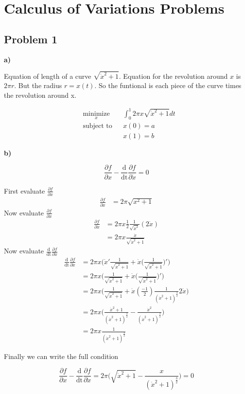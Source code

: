 \section{Calculus of Variations Problems}

\subsection{Problem 1}

\textbf{a)}

\answer

Equation of length of a curve $\sqrt{\dot{x}^2 +1}$. Equation for the revolution around $x$ is $2 \pi r$. But the radius $r = x(t)$. So the funtional is each piece of the curve times the revolution around x.

\begin{equation*}
\begin{aligned}
& \underset{x}{\text{minimize}}
& & \int_0^1 2 \pi x \sqrt{\dot{x}^2 + 1} dt \\
& \text{subject to}
& & x(0) = a \\
&&& x(1) = b
\end{aligned}
\end{equation*}

\textbf{b)}

\answer

\[
	\frac{\partial f}{\partial x} - \frac{\text{d}}{\text{dt}} \frac{\partial f}{\partial \dot{x}} = 0
\]

First evaluate $\frac{\partial f}{\partial x}$
\begin{align*}
	\frac{\partial f}{\partial x} &= 2 \pi \sqrt{x^2 + 1}
\end{align*}
Now evaluate $\frac{\partial f}{\partial \dot{x}}$
\begin{align*}
	\frac{\partial f}{\partial \dot{x}} &=
		2 \pi x \frac{1}{2} \frac{1}{\sqrt{\dot{x}^2}} (2 \dot{x}) \\
	&= 2 \pi x \frac{\dot{x}}{\sqrt{\dot{x}^2 + 1}}
\end{align*}
Now evaluate $\frac{\text{d}}{\text{dt}} \frac{\partial f}{\partial \dot{x}}$
\begin{align*}
	\frac{\text{d}}{\text{dt}} \frac{\partial f}{\partial \dot{x}} &=
		2 \pi x \Big( \dot{x}' \frac{1}{\sqrt{\dot{x}^2 + 1}} + \dot{x} \big(\frac{1}{\sqrt{\dot{x}^2 + 1}}\big)'   \Big) \\
&= 2 \pi x \Big( \frac{1}{\sqrt{\dot{x}^2 + 1}} + \dot{x} \big(      \frac{1}{\sqrt{\dot{x}^2 + 1}}   \big)'   \Big) \\
&= 2 \pi x \Big( \frac{1}{\sqrt{\dot{x}^2 + 1}} + \dot{x} (\frac{-1}{2}) \frac{1}{(\dot{x}^2 + 1)^{\frac{3}{2}}} 2 \dot{x}   \Big) \\
&= 2 \pi x \Big( \frac{\dot{x}^2 + 1}{(\dot{x}^2 + 1)^{\frac{3}{2}}} - \frac{\dot{x}^2}{(\dot{x}^2 + 1)^{\frac{3}{2}}} \Big) \\
&= 2 \pi x \frac{1}{(\dot{x}^2 + 1)^{\frac{3}{2}}}
\end{align*}

Finally we can write the full condition

\[
	\frac{\partial f}{\partial x} - \frac{\text{d}}{\text{dt}} \frac{\partial f}{\partial \dot{x}} = 2 \pi \Bigg( \sqrt{\dot{x}^2 +1} - \frac{x}{(\dot{x}^2 + 1)^\frac{3}{2}} \Bigg) = 0
\]